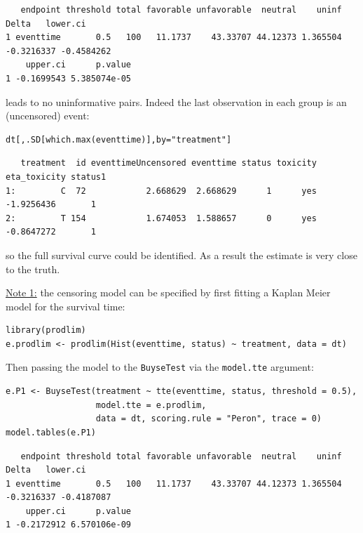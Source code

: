 \documentclass[12pt]{article}
\begin{document}
\begin{verbatim}
   endpoint threshold total favorable unfavorable  neutral    uninf      Delta   lower.ci
1 eventtime       0.5   100   11.1737    43.33707 44.12373 1.365504 -0.3216337 -0.4584262
    upper.ci      p.value
1 -0.1699543 5.385074e-05
\end{verbatim}

leads to no uninformative pairs. Indeed the last observation in each group is an (uncensored) event:
\lstset{language=r,label= ,caption= ,captionpos=b,numbers=none}
\begin{lstlisting}
dt[,.SD[which.max(eventtime)],by="treatment"]
\end{lstlisting}

\begin{verbatim}
   treatment  id eventtimeUncensored eventtime status toxicity eta_toxicity status1
1:         C  72            2.668629  2.668629      1      yes   -1.9256436       1
2:         T 154            1.674053  1.588657      0      yes   -0.8647272       1
\end{verbatim}

so the full survival curve could be identified. As a result the estimate is very close to the
truth. 

\bigskip

\uline{Note 1:} the censoring model can be specified by first fitting a
Kaplan Meier model for the survival time:
\lstset{language=r,label= ,caption= ,captionpos=b,numbers=none}
\begin{lstlisting}
library(prodlim)
e.prodlim <- prodlim(Hist(eventtime, status) ~ treatment, data = dt)
\end{lstlisting}

Then passing the model to the \texttt{BuyseTest} via the \texttt{model.tte} argument:
\lstset{language=r,label= ,caption= ,captionpos=b,numbers=none}
\begin{lstlisting}
e.P1 <- BuyseTest(treatment ~ tte(eventtime, status, threshold = 0.5),
                  model.tte = e.prodlim,
                  data = dt, scoring.rule = "Peron", trace = 0)
model.tables(e.P1)
\end{lstlisting}

\begin{verbatim}
   endpoint threshold total favorable unfavorable  neutral    uninf      Delta   lower.ci
1 eventtime       0.5   100   11.1737    43.33707 44.12373 1.365504 -0.3216337 -0.4187087
    upper.ci      p.value
1 -0.2172912 6.570106e-09
\end{verbatim}
\end{document}
